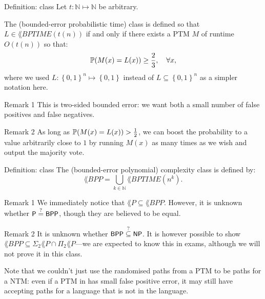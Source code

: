 \documentclass[a4paper]{article}
\begin{document}
\begin{parag}{Definition:  class}
    Let $t: \mathbb{N} \mapsto \mathbb{N}$ be arbitrary.

    The  (bounded-error probabilistic time) class is defined so that $L \in \lang{BPTIME}\left(t\left(n\right)\right)$ if and only if there exists a PTM $M$ of runtime $O\left(t\left(n\right)\right)$ so that: 
    \[\prob\left(M\left(x\right) = L\left(x\right)\right) \geq \frac{2}{3}, \mathspace \forall x,\]
    where we used $L: \left\{0, 1\right\}^n \mapsto \left\{0, 1\right\}$ instead of $L \subseteq \left\{0, 1\right\}^n$ as a simpler notation here.

    \begin{subparag}{Remark 1}
        This is two-sided bounded error: we want both a small number of false positives and false negatives.
    \end{subparag}

    \begin{subparag}{Remark 2}
        As long as $\prob\left(M\left(x\right) = L\left(x\right)\right) > \frac{1}{2}$, we can boost the probability to a value arbitrarily close to $1$ by running $M\left(x\right)$ as many times as we wish and output the majority vote.
    \end{subparag}
\end{parag}

\begin{parag}{Definition:  class}
    The  (bounded-error polynomial) complexity class is defined by: 
    \[\lang{BPP} = \bigcup_{k \in \mathbb{N}} \lang{BPTIME}\left(n^k\right).\]

    \begin{subparag}{Remark 1}
        We immediately notice that $\lang{P} \subseteq \lang{BPP}$. However, it is unknown whether $\lang{P} \over{=}{?}  \lang{BPP}$, though they are believed to be equal.
    \end{subparag}

    \begin{subparag}{Remark 2}
        It is unknown whether $\lang{BPP} \over{\subseteq}{?} \lang{NP}$. It is however possible to show $\lang{BPP} \subseteq \Sigma_2 \lang{P} \cap \Pi_2 \lang{P}$---we are expected to know this in exams, although we will not prove it in this class.

        Note that we couldn't just use the randomised paths from a PTM to be paths for a NTM: even if a PTM in  has small false positive error, it may still have accepting paths for a language that is not in the language.
    \end{subparag}
\end{parag}
\end{document}
